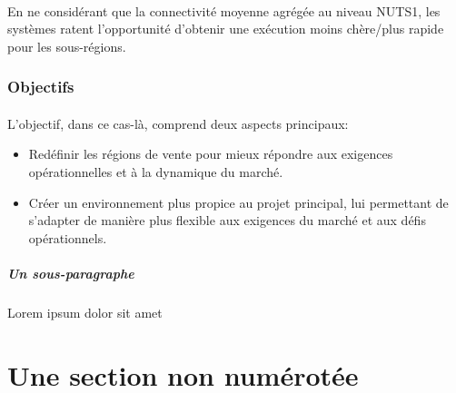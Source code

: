 \paragraph{}
\vspace{-2em}
En ne considérant que la connectivité moyenne agrégée au niveau NUTS1, les systèmes ratent l'opportunité d'obtenir une exécution moins chère/plus rapide pour les sous-régions.
\subsubsection{Objectifs}
\paragraph{}
\vspace{-2em}
L'objectif, dans ce cas-là, comprend deux aspects principaux:
    \begin{itemize}
    \item Redéfinir les régions de vente pour mieux répondre aux exigences opérationnelles et à la dynamique du marché.
    \item Créer un environnement plus propice au projet principal, lui permettant de s'adapter de manière plus flexible aux exigences du marché et aux défis opérationnels.
    \end{itemize}
\paragraph{}
\vspace{-2em}
\subparagraph{Un sous-paragraphe}
Lorem ipsum dolor sit amet
\section*{Une section non numérotée}
